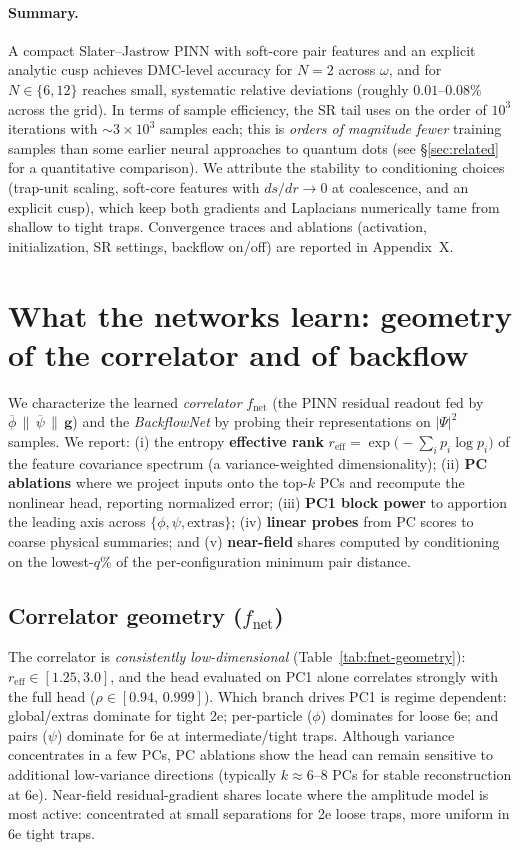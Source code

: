 \paragraph{Summary.}
A compact Slater–Jastrow PINN with soft-core pair features and an explicit analytic cusp achieves DMC-level accuracy for $N{=}2$ across $\omega$, and for $N\!\in\!\{6,12\}$ reaches small, systematic relative deviations (roughly $0.01$–$0.08\%$ across the grid). In terms of sample efficiency, the SR tail uses on the order of $10^3$ iterations with $\sim\!3{\times}10^3$ samples each; this is \emph{orders of magnitude fewer} training samples than some earlier neural approaches to quantum dots (see \S\ref{sec:related} for a quantitative comparison). We attribute the stability to conditioning choices (trap-unit scaling, soft-core features with $ds/dr\!\to\!0$ at coalescence, and an explicit cusp), which keep both gradients and Laplacians numerically tame from shallow to tight traps. Convergence traces and ablations (activation, initialization, SR settings, backflow on/off) are reported in Appendix~X.

\section{What the networks learn: geometry of the correlator and of backflow}
\label{sec:repr-analysis}

We characterize the learned \emph{correlator} $f_{\text{net}}$ (the PINN residual readout fed by
$\overline{\phi}\,\|\,\overline{\psi}\,\|\,\mathbf g$) and the \emph{BackflowNet} by probing their
representations on $|\Psi|^2$ samples. We report:
(i) the entropy \textbf{effective rank} $r_{\text{eff}}=\exp\!\big(-\sum_i p_i\log p_i\big)$ of the feature
covariance spectrum (a variance-weighted dimensionality);
(ii) \textbf{PC ablations} where we project inputs onto the top-$k$ PCs and recompute the nonlinear head,
reporting normalized error;
(iii) \textbf{PC1 block power} to apportion the leading axis across $\{\phi,\psi,\text{extras}\}$;
(iv) \textbf{linear probes} from PC scores to coarse physical summaries; and
(v) \textbf{near-field} shares computed by conditioning on the lowest-$q\%$ of the per-configuration minimum pair distance.

\subsection{Correlator geometry ($f_{\text{net}}$)}
The correlator is \emph{consistently low-dimensional} (Table~\ref{tab:fnet-geometry}): $r_{\text{eff}}\!\in[1.25,3.0]$,
and the head evaluated on PC1 alone correlates strongly with the full head ($\rho\!\in[0.94,\,0.999]$).
Which branch drives PC1 is regime dependent:
global/extras dominate for tight 2e; per-particle ($\phi$) dominates for loose 6e; and pairs ($\psi$) dominate for 6e at intermediate/tight traps. Although variance concentrates in a few PCs, PC ablations show the head can remain sensitive to additional low-variance directions (typically $k\!\approx\!6$–$8$ PCs for stable reconstruction at 6e). Near-field residual-gradient shares locate where the amplitude model is most active: concentrated at small separations for 2e loose traps, more uniform in 6e tight traps.

